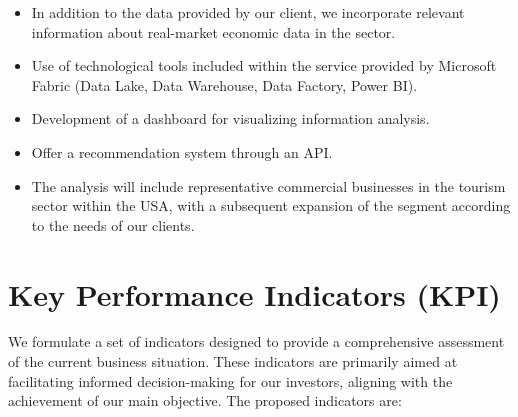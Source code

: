 \documentclass[12pt]{article}
\begin{document}
\begin{itemize}
    \item In addition to the data provided by our client, we incorporate relevant information about real-market economic data in the sector.
    \item Use of technological tools included within the service provided by Microsoft Fabric (Data Lake, Data Warehouse, Data Factory, Power BI).
    \item Development of a dashboard for visualizing information analysis.
    \item Offer a recommendation system through an API.
    \item The analysis will include representative commercial businesses in the tourism sector within the USA, with a subsequent expansion of the segment according to the needs of our clients.
\end{itemize}

\section{Key Performance Indicators (KPI)}

We formulate a set of indicators designed to provide a comprehensive assessment of the current business situation. These indicators are primarily aimed at facilitating informed decision-making for our investors, aligning with the achievement of our main objective. The proposed indicators are:
\end{document}
